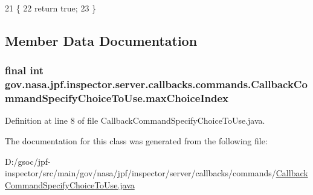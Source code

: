 \begin{DoxyCode}
21                                  \{
22     \textcolor{keywordflow}{return} \textcolor{keyword}{true};
23   \}
\end{DoxyCode}


\subsection{Member Data Documentation}
\subsubsection[{\texorpdfstring{max\+Choice\+Index}{maxChoiceIndex}}]{\setlength{\rightskip}{0pt plus 5cm}final int gov.\+nasa.\+jpf.\+inspector.\+server.\+callbacks.\+commands.\+Callback\+Command\+Specify\+Choice\+To\+Use.\+max\+Choice\+Index\hspace{0.3cm}{\ttfamily [private]}}\hypertarget{classgov_1_1nasa_1_1jpf_1_1inspector_1_1server_1_1callbacks_1_1commands_1_1_callback_command_specify_choice_to_use_ab5382d28f683284f739983494ad94584}{}\label{classgov_1_1nasa_1_1jpf_1_1inspector_1_1server_1_1callbacks_1_1commands_1_1_callback_command_specify_choice_to_use_ab5382d28f683284f739983494ad94584}


Definition at line 8 of file Callback\+Command\+Specify\+Choice\+To\+Use.\+java.



The documentation for this class was generated from the following file\+:\begin{DoxyCompactItemize}
\item 
D\+:/gsoc/jpf-\/inspector/src/main/gov/nasa/jpf/inspector/server/callbacks/commands/\hyperlink{_callback_command_specify_choice_to_use_8java}{Callback\+Command\+Specify\+Choice\+To\+Use.\+java}\end{DoxyCompactItemize}
